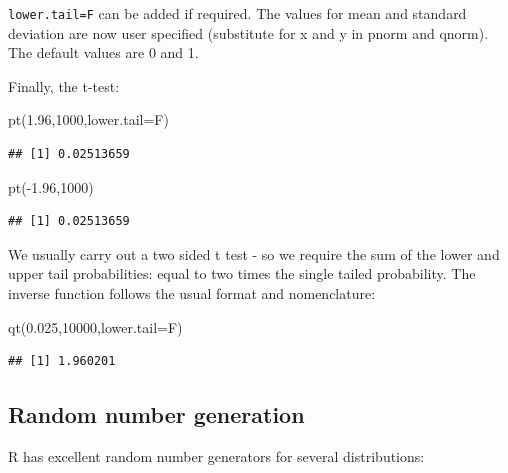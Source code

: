 \documentclass[
]{book}
\newenvironment{Shaded}{\begin{snugshade}}{\end{snugshade}}
\newcommand{\AttributeTok}[1]{\textcolor[rgb]{0.77,0.63,0.00}{#1}}
\newcommand{\DecValTok}[1]{\textcolor[rgb]{0.00,0.00,0.81}{#1}}
\newcommand{\FloatTok}[1]{\textcolor[rgb]{0.00,0.00,0.81}{#1}}
\newcommand{\FunctionTok}[1]{\textcolor[rgb]{0.00,0.00,0.00}{#1}}
\newcommand{\NormalTok}[1]{#1}
\newcommand{\SpecialCharTok}[1]{\textcolor[rgb]{0.00,0.00,0.00}{#1}}
\begin{document}
\texttt{lower.tail=F} can be added if required. The values for mean and standard deviation are now user specified (substitute for x and y in pnorm and qnorm). The default values are 0 and 1.

Finally, the t-test:

\begin{Shaded}
\begin{Highlighting}[]
\FunctionTok{pt}\NormalTok{(}\FloatTok{1.96}\NormalTok{,}\DecValTok{1000}\NormalTok{,}\AttributeTok{lower.tail=}\NormalTok{F) }
\end{Highlighting}
\end{Shaded}

\begin{verbatim}
## [1] 0.02513659
\end{verbatim}

\begin{Shaded}
\begin{Highlighting}[]
\FunctionTok{pt}\NormalTok{(}\SpecialCharTok{{-}}\FloatTok{1.96}\NormalTok{,}\DecValTok{1000}\NormalTok{) }
\end{Highlighting}
\end{Shaded}

\begin{verbatim}
## [1] 0.02513659
\end{verbatim}

We usually carry out a two sided t test - so we require the sum of the lower and upper tail probabilities: equal to two times the single tailed probability. The inverse function follows the usual format and nomenclature:

\begin{Shaded}
\begin{Highlighting}[]
\FunctionTok{qt}\NormalTok{(}\FloatTok{0.025}\NormalTok{,}\DecValTok{10000}\NormalTok{,}\AttributeTok{lower.tail=}\NormalTok{F)}
\end{Highlighting}
\end{Shaded}

\begin{verbatim}
## [1] 1.960201
\end{verbatim}

\hypertarget{random-number-generation}{%
\subsection{Random number generation}\label{random-number-generation}}

R has excellent random number generators for several distributions:
\end{document}

